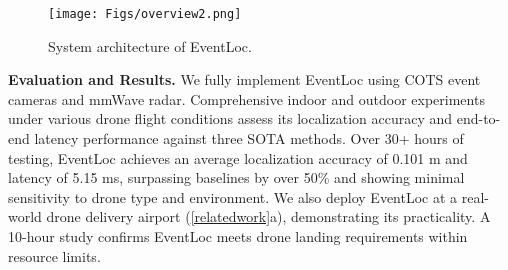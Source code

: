 \begin{figure*}[t]
    \setlength{\abovecaptionskip}{0.4cm} %
    \setlength{\belowcaptionskip}{-0.5cm}
    \setlength{\subfigcapskip}{-0.25cm}
    \centering
        \texttt{[image: Figs/overview2.png]}
        \vspace{-0.2cm}
    \caption{System architecture of EventLoc.}
    \label{overview}
\end{figure*} 




\noindent \textbf{Evaluation and Results.}  
We fully implement EventLoc using COTS event cameras and mmWave radar. 
Comprehensive indoor and outdoor experiments under various drone flight conditions assess its localization accuracy and end-to-end latency performance against three SOTA methods.
Over 30+ hours of testing, EventLoc achieves an average localization accuracy of 0.101 m and latency of 5.15 ms, surpassing baselines by over 50\% and showing minimal sensitivity to drone type and environment.
We also deploy EventLoc at a real-world drone delivery airport (\fig \ref{relatedwork}a), demonstrating its practicality. A 10-hour study confirms EventLoc meets drone landing requirements within resource limits.
 
